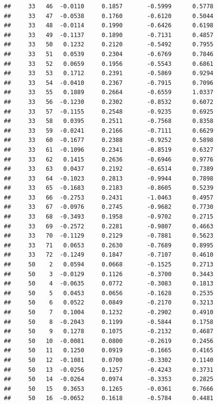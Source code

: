 \documentclass[
]{article}
\begin{document}
\begin{verbatim}
##     33   46  -0.0110     0.1857       -0.5999      0.5778  
##     33   47  -0.0538     0.1760       -0.6120      0.5044  
##     33   48  -0.0114     0.1990       -0.6426      0.6198  
##     33   49  -0.1137     0.1890       -0.7131      0.4857  
##     33   50   0.1232     0.2120       -0.5492      0.7955  
##     33   51   0.0539     0.2304       -0.6769      0.7846  
##     33   52   0.0659     0.1956       -0.5543      0.6861  
##     33   53   0.1712     0.2391       -0.5869      0.9294  
##     33   54  -0.0410     0.2367       -0.7915      0.7096  
##     33   55   0.1889     0.2664       -0.6559      1.0337  
##     33   56  -0.1230     0.2302       -0.8532      0.6072  
##     33   57  -0.1155     0.2548       -0.9235      0.6925  
##     33   58   0.0395     0.2511       -0.7568      0.8358  
##     33   59  -0.0241     0.2166       -0.7111      0.6629  
##     33   60  -0.1677     0.2388       -0.9252      0.5898  
##     33   61  -0.1096     0.2341       -0.8519      0.6327  
##     33   62   0.1415     0.2636       -0.6946      0.9776  
##     33   63   0.0437     0.2192       -0.6514      0.7389  
##     33   64  -0.1023     0.2813       -0.9944      0.7898  
##     33   65  -0.1683     0.2183       -0.8605      0.5239  
##     33   66  -0.2753     0.2431       -1.0463      0.4957  
##     33   67  -0.0976     0.2745       -0.9682      0.7730  
##     33   68  -0.3493     0.1958       -0.9702      0.2715  
##     33   69  -0.2572     0.2281       -0.9807      0.4663  
##     33   70  -0.1129     0.2129       -0.7881      0.5623  
##     33   71   0.0653     0.2630       -0.7689      0.8995  
##     33   72  -0.1249     0.1847       -0.7107      0.4610  
##     50    2   0.0594     0.0668       -0.1525      0.2713  
##     50    3  -0.0129     0.1126       -0.3700      0.3443  
##     50    4  -0.0635     0.0772       -0.3083      0.1813  
##     50    5   0.0453     0.0656       -0.1628      0.2535  
##     50    6   0.0522     0.0849       -0.2170      0.3213  
##     50    7   0.1004     0.1232       -0.2902      0.4910  
##     50    8  -0.2043     0.1199       -0.5844      0.1758  
##     50    9   0.1278     0.1075       -0.2132      0.4687  
##     50   10  -0.0081     0.0800       -0.2619      0.2456  
##     50   11   0.1250     0.0919       -0.1665      0.4165  
##     50   12  -0.1081     0.0700       -0.3302      0.1140  
##     50   13  -0.0256     0.1257       -0.4243      0.3731  
##     50   14  -0.0264     0.0974       -0.3353      0.2825  
##     50   15   0.3653     0.1265       -0.0361      0.7666  
##     50   16  -0.0652     0.1618       -0.5784      0.4481  

\end{verbatim}
\end{document}
